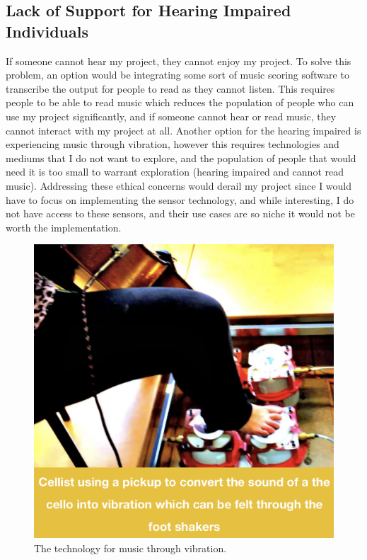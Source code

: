 \documentclass[10pt,twocolumn]{article}
\begin{document}
    \subsection{Lack of Support for Hearing Impaired Individuals}
        If someone cannot hear my project, they cannot enjoy my project. To solve this problem, an option would be integrating some sort of music scoring software to transcribe the output for people to read as they cannot listen. This requires people to be able to read music which reduces the population of people who can use my project significantly, and if someone cannot hear or read music, they cannot interact with my project at all. Another option for the hearing impaired is experiencing music through vibration, however this requires technologies and mediums that I do not want to explore, and the population of people that would need it is too small to warrant exploration (hearing impaired and cannot read music). Addressing these ethical concerns would derail my project since I would have to focus on implementing the sensor technology, and while interesting, I do not have access to these sensors, and their use cases are so niche it would not be worth the implementation.
        \begin{figure}[h]
            \centering
            \includegraphics[width=.95\linewidth]{vibes.png}
            \caption{
                The technology for music through vibration\cite{MusicalVibrations}.
            }
            \label{fig:first-page}
        \end{figure}
    
\end{document}
